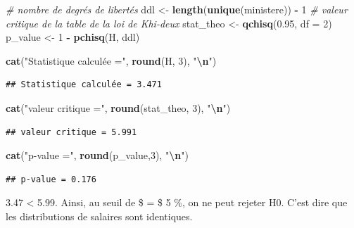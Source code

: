 \documentclass[
  12pt,
]{article}
\newenvironment{Shaded}{\begin{snugshade}}{\end{snugshade}}
\newcommand{\AttributeTok}[1]{\textcolor[rgb]{0.13,0.29,0.53}{#1}}
\newcommand{\CommentTok}[1]{\textcolor[rgb]{0.56,0.35,0.01}{\textit{#1}}}
\newcommand{\DecValTok}[1]{\textcolor[rgb]{0.00,0.00,0.81}{#1}}
\newcommand{\FloatTok}[1]{\textcolor[rgb]{0.00,0.00,0.81}{#1}}
\newcommand{\FunctionTok}[1]{\textcolor[rgb]{0.13,0.29,0.53}{\textbf{#1}}}
\newcommand{\NormalTok}[1]{#1}
\newcommand{\OtherTok}[1]{\textcolor[rgb]{0.56,0.35,0.01}{#1}}
\newcommand{\SpecialCharTok}[1]{\textcolor[rgb]{0.81,0.36,0.00}{\textbf{#1}}}
\newcommand{\StringTok}[1]{\textcolor[rgb]{0.31,0.60,0.02}{#1}}
\begin{document}
\begin{Shaded}
\begin{Highlighting}[]
\CommentTok{\# nombre de degrés de libertés}
\NormalTok{ddl }\OtherTok{\textless{}{-}} \FunctionTok{length}\NormalTok{(}\FunctionTok{unique}\NormalTok{(ministere)) }\SpecialCharTok{{-}} \DecValTok{1}  
\CommentTok{\# valeur critique de la table de la loi de Khi{-}deux }
\NormalTok{stat\_theo }\OtherTok{\textless{}{-}} \FunctionTok{qchisq}\NormalTok{(}\FloatTok{0.95}\NormalTok{, }\AttributeTok{df =} \DecValTok{2}\NormalTok{)}
\NormalTok{p\_value }\OtherTok{\textless{}{-}} \DecValTok{1} \SpecialCharTok{{-}} \FunctionTok{pchisq}\NormalTok{(H, ddl)}

\FunctionTok{cat}\NormalTok{(}\StringTok{"Statistique calculée ="}\NormalTok{, }\FunctionTok{round}\NormalTok{(H, }\DecValTok{3}\NormalTok{), }\StringTok{"}\SpecialCharTok{\textbackslash{}n}\StringTok{"}\NormalTok{)}
\end{Highlighting}
\end{Shaded}

\begin{verbatim}
## Statistique calculée = 3.471
\end{verbatim}

\begin{Shaded}
\begin{Highlighting}[]
\FunctionTok{cat}\NormalTok{(}\StringTok{"valeur critique ="}\NormalTok{, }\FunctionTok{round}\NormalTok{(stat\_theo, }\DecValTok{3}\NormalTok{), }\StringTok{"}\SpecialCharTok{\textbackslash{}n}\StringTok{"}\NormalTok{)}
\end{Highlighting}
\end{Shaded}

\begin{verbatim}
## valeur critique = 5.991
\end{verbatim}

\begin{Shaded}
\begin{Highlighting}[]
\FunctionTok{cat}\NormalTok{(}\StringTok{"p{-}value ="}\NormalTok{, }\FunctionTok{round}\NormalTok{(p\_value,}\DecValTok{3}\NormalTok{), }\StringTok{"}\SpecialCharTok{\textbackslash{}n}\StringTok{"}\NormalTok{)}
\end{Highlighting}
\end{Shaded}

\begin{verbatim}
## p-value = 0.176
\end{verbatim}

3.47 \textless{} 5.99. Ainsi, au seuil de \$ \alpha = \$ 5 \%, on ne
peut rejeter H0. C'est dire que les distributions de salaires sont
identiques.
\end{document}
